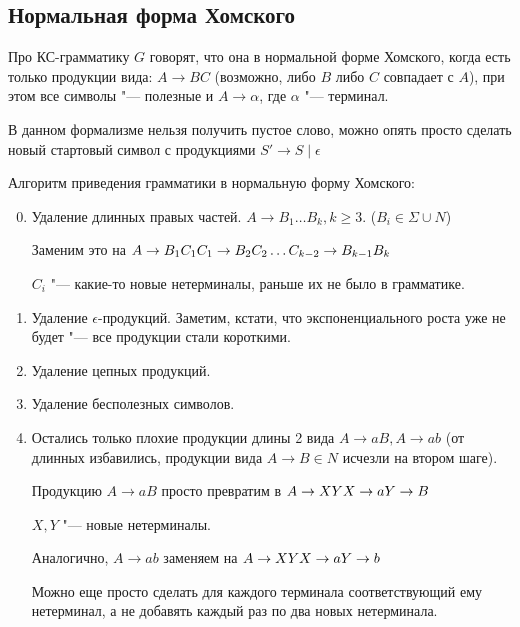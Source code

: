 \subsection{Нормальная форма Хомского}
\begin{Def}
Про КС-грамматику $G$ говорят, что она в нормальной форме Хомского, когда есть только продукции вида: $A \to BC$ (возможно, либо $B$ либо $C$ совпадает с $A$), при этом все символы "--- полезные и $A \to \alpha$, где $\alpha$ "--- терминал.
\end{Def}
\begin{Rem}
В данном формализме нельзя получить пустое слово, можно опять просто сделать новый стартовый символ с продукциями $S' \to S \mid \epsilon$
\end{Rem}                                                                                                                              

Алгоритм приведения грамматики в нормальную форму Хомского:

\begin{enumerate}
\setcounter{enumi}{-1}
\item
Удаление длинных правых частей.
$A \to B_1 \dots B_k, k \geq 3$. ($B_i \in \Sigma \cup N$) 

Заменим это на $\\
A \to B_1C_1 \\
C_1 \to B_2C_2 \\
\dots \\
C_{k-2} \to B_{k-1}B_k$
                                      
$C_i$ "--- какие-то новые нетерминалы, раньше их не было в грамматике.

\item
Удаление $\epsilon$-продукций. Заметим, кстати, что экспоненциального роста уже не будет "--- все продукции стали короткими.

\item
Удаление цепных продукций.

\item
Удаление бесполезных символов.

\item
Остались только плохие продукции длины 2 вида $A \to aB, A \to ab$ (от длинных избавились, продукции вида $A \to B \in N$ исчезли на втором шаге).

Продукцию $A \to aB$ просто превратим в $\\
A \to XY \\
X \to a \\
Y \to B
$

$X, Y$ "--- новые нетерминалы.

Аналогично, $A \to ab$ заменяем на 
$\\
A \to XY \\
X \to a \\
Y \to b
$

Можно еще просто сделать для каждого терминала соответствующий ему нетерминал, а не добавять каждый раз по два новых нетерминала.
\end{enumerate}                        

